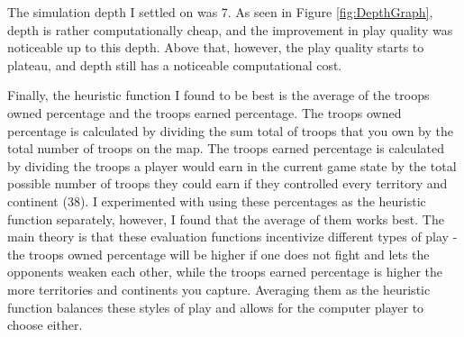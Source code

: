 The simulation depth I settled on was 7. As seen in Figure \ref{fig:DepthGraph}, depth is rather computationally cheap, and the improvement in play quality was noticeable up to this depth. Above that, however, the play quality starts to plateau, and depth still has a noticeable computational cost.

Finally, the heuristic function I found to be best is the average of the troops owned percentage and the troops earned percentage. The troops owned percentage is calculated by dividing the sum total of troops that you own by the total number of troops on the map. The troops earned percentage is calculated by dividing the troops a player would earn in the current game state by the total possible number of troops they could earn if they controlled every territory and continent (38). I experimented with using these percentages as the heuristic function separately, however, I found that the average of them works best. The main theory is that these evaluation functions incentivize different types of play - the troops owned percentage will be higher if one does not fight and lets the opponents weaken each other, while the troops earned percentage is higher the more territories and continents you capture. Averaging them as the heuristic function balances these styles of play and allows for the computer player to choose either.